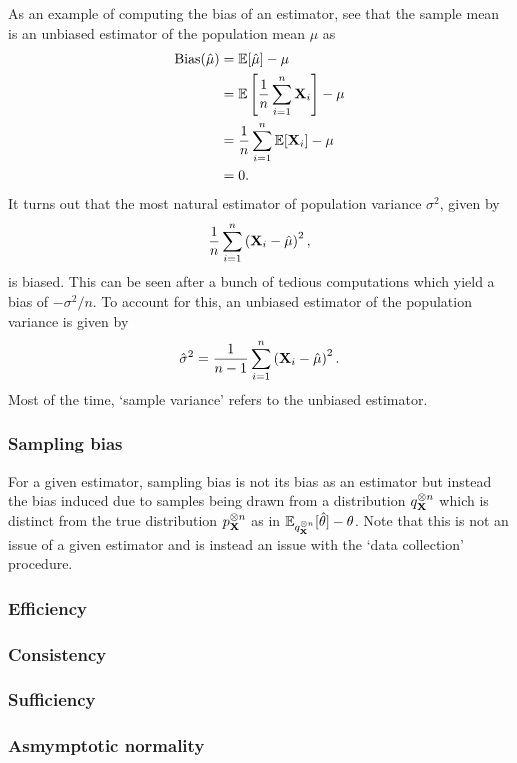 \documentclass[11pt]{article}
\begin{document}
\begin{appendices}
As an example of computing the bias of an estimator, see that the sample mean is an unbiased estimator of the population mean $\mu$ as
\begin{align*}
    \text{Bias}(\hat{\mu})
    &=
    \mathbb{E}[\hat{\mu}]-\mu\\
    &=
    \mathbb{E}\left[\frac{1}{n}\sum_{i=1}^n\mathbf{X}_i\right]-\mu\\
    &=
    \frac{1}{n}\sum_{i=1}^n\mathbb{E}[\mathbf{X}_i]-\mu\\
    &=
    0.
\end{align*}
It turns out that the most natural estimator of population variance $\sigma^2$, given by
$$
\frac{1}{n}\sum_{i=1}^n\left(\mathbf{X}_i-\hat{\mu}\right)^2,
$$
is biased. This can be seen after a bunch of tedious computations which yield a bias of $-\sigma^2/n$. To account for this, an unbiased estimator of the population variance is given by
$$
\hat{\sigma}^2
=
\frac{1}{n-1}\sum_{i=1}^n\left(\mathbf{X}_i-\hat{\mu}\right)^2.
$$
Most of the time, `sample variance' refers to the unbiased estimator.

\subsubsection{Sampling bias}
For a given estimator, sampling bias is not its bias as an estimator but instead the bias induced due to samples being drawn from a distribution $q_{\mathbf{X}}^{\otimes n}$ which is distinct from the true distribution $p_{\mathbf{X}}^{\otimes n}$ as in $\mathbb{E}_{q_{\mathbf{X}}^{\otimes n}}[\hat{\theta}]-\theta$. Note that this is not an issue of a given estimator and is instead an issue with the `data collection' procedure.

\subsubsection{Efficiency}

\subsubsection{Consistency}

\subsubsection{Sufficiency}

\subsubsection{Asmymptotic normality}


\end{appendices}
\end{document}
